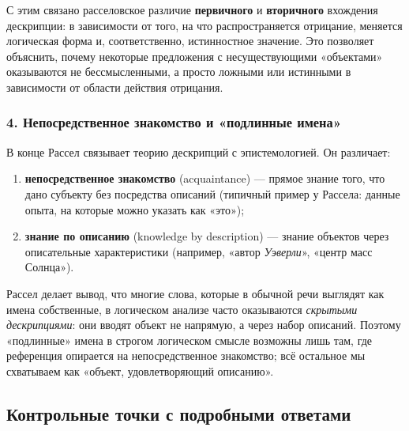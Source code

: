 \documentclass[a4paper,12pt]{article}
\begin{document}
С этим связано расселовское различие \textbf{первичного} и \textbf{вторичного} вхождения дескрипции: в зависимости от того, на что распространяется отрицание, меняется логическая форма и, соответственно, истинностное значение. Это позволяет объяснить, почему некоторые предложения с несуществующими «объектами» оказываются не бессмысленными, а просто ложными или истинными в зависимости от области действия отрицания.

\subsubsection*{4. Непосредственное знакомство и «подлинные имена»}

В конце Рассел связывает теорию дескрипций с эпистемологией. Он различает:
\begin{enumerate}
    \item \textbf{непосредственное знакомство} (acquaintance) --- прямое знание того, что дано субъекту без посредства описаний (типичный пример у Рассела: данные опыта, на которые можно указать как «это»);
    \item \textbf{знание по описанию} (knowledge by description) --- знание объектов через описательные характеристики (например, «автор \emph{Уэверли}», «центр масс Солнца»).
\end{enumerate}
Рассел делает вывод, что многие слова, которые в обычной речи выглядят как имена собственные, в логическом анализе часто оказываются \emph{скрытыми дескрипциями}: они вводят объект не напрямую, а через набор описаний. Поэтому «подлинные» имена в строгом логическом смысле возможны лишь там, где референция опирается на непосредственное знакомство; всё остальное мы схватываем как «объект, удовлетворяющий описанию».

\subsection{Контрольные точки с подробными ответами}
\end{document}

